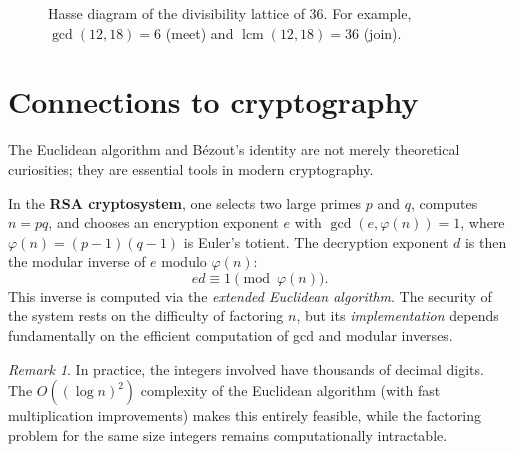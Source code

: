 \documentclass[12pt,a4paper,openany]{book}
\theoremstyle{definition}
\theoremstyle{plain}
\theoremstyle{remark}
\newtheorem{remark}[definition]{Remark}
\DeclareMathOperator{\lcm}{lcm}
\begin{document}
\begin{figure}[ht]
\centering
{}
\caption{Hasse diagram of the divisibility lattice of $36$.
  For example, $\gcd(12,18) = 6$ (meet) and $\lcm(12,18) = 36$ (join).}
\label{fig:divisibility-lattice}
\end{figure}

\section{Connections to cryptography}
\label{sec:crypto-gcd}

The Euclidean algorithm and B\'{e}zout's identity are not merely theoretical
curiosities; they are essential tools in modern cryptography.

In the \textbf{RSA cryptosystem}, one selects two large primes
$p$ and $q$, computes $n = pq$, and chooses an encryption exponent $e$ with
$\gcd(e, \varphi(n)) = 1$, where $\varphi(n) = (p-1)(q-1)$ is Euler's totient.
The decryption exponent $d$ is then the modular inverse of $e$ modulo
$\varphi(n)$:
\[
  ed \equiv 1 \pmod{\varphi(n)}.
\]
This inverse is computed via the \emph{extended Euclidean algorithm}.
The security of the system rests on the difficulty of factoring $n$, but
its \emph{implementation} depends fundamentally on the efficient computation
of gcd and modular inverses.

\begin{remark}
\label{rem:crypto-efficiency}
In practice, the integers involved have thousands of decimal digits. The
$O((\log n)^2)$ complexity of the Euclidean algorithm (with fast multiplication
improvements) makes this entirely feasible, while the factoring problem for
the same size integers remains computationally intractable.
\end{remark}
\end{document}
